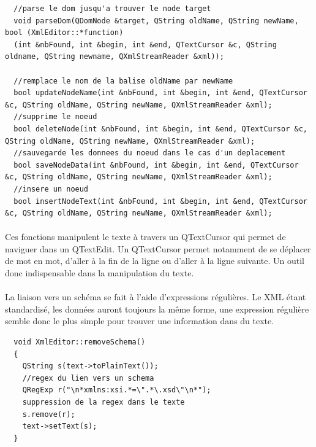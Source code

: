 \begin{lstlisting}
  //parse le dom jusqu'a trouver le node target
  void parseDom(QDomNode &target, QString oldName, QString newName, bool (XmlEditor::*function)
  (int &nbFound, int &begin, int &end, QTextCursor &c, QString oldname, QString newname, QXmlStreamReader &xml));
  
  //remplace le nom de la balise oldName par newName
  bool updateNodeName(int &nbFound, int &begin, int &end, QTextCursor &c, QString oldName, QString newName, QXmlStreamReader &xml);
  //supprime le noeud
  bool deleteNode(int &nbFound, int &begin, int &end, QTextCursor &c, QString oldName, QString newName, QXmlStreamReader &xml);
  //sauvegarde les donnees du noeud dans le cas d'un deplacement
  bool saveNodeData(int &nbFound, int &begin, int &end, QTextCursor &c, QString oldName, QString newName, QXmlStreamReader &xml);
  //insere un noeud
  bool insertNodeText(int &nbFound, int &begin, int &end, QTextCursor &c, QString oldName, QString newName, QXmlStreamReader &xml);
\end{lstlisting}
\paragraph{}
Ces fonctions manipulent le texte à travers un QTextCursor qui permet de naviguer dans un QTextEdit. Un QTextCursor permet notamment de se déplacer de mot en mot, d'aller à la fin de la ligne ou d'aller à la ligne suivante. Un outil donc indispensable dans la manipulation du texte.

\paragraph{}
La liaison vers un schéma se fait à l'aide d'expressions régulières. Le XML étant standardisé, les données auront toujours la même forme, une expression régulière semble donc le plus simple pour trouver une information dans du texte.

\begin{lstlisting}
  void XmlEditor::removeSchema()
  {
    QString s(text->toPlainText());
    //regex du lien vers un schema
    QRegExp r("\n*xmlns:xsi.*=\".*\.xsd\"\n*");
    suppression de la regex dans le texte
    s.remove(r);
    text->setText(s);
  }
\end{lstlisting}
